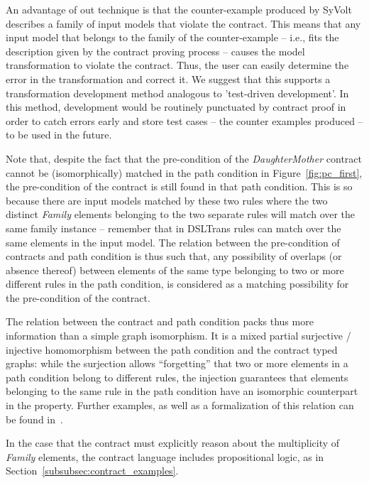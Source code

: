 An advantage of out technique is that the counter-example produced by SyVolt
describes a family of
input models that violate the contract.
This means that any input model that belongs to the family of the
counter-example -- i.e., fits the description given by the contract proving
process -- causes the model transformation to violate the contract.  Thus, the user can
easily determine the error in the transformation and correct it. We suggest that
this supports a transformation development method analogous to 'test-driven
development'. In this method, development would be routinely punctuated by
contract proof in order to catch errors early and store test cases -- the
counter examples produced -- to be used in the future.



Note that, despite the fact that the pre-condition of the
\textit{Daughter\-Mother} contract cannot be (isomorphically) matched in the path
condition in Figure~\ref{fig:pc_first}, the pre-condition of the contract is still
found in that path condition. This is so because there are input models
matched by these two rules where the two distinct \textit{Family} elements
belonging to the two separate rules will match over the same family instance --
remember that in DSLTrans rules can match over the same elements in the input
model. The relation between the pre-condition of contracts and path condition is
thus such that, any possibility of overlaps (or absence thereof) between
elements of the same type belonging to two or more different rules in the path condition,
is considered as a matching possibility for the pre-condition of the
contract.

The relation between the contract and path condition packs thus more
information than a simple graph isomorphism. It is a mixed partial surjective /
injective homomorphism between the path condition and the contract typed graphs:
while the surjection allows ``forgetting'' that two or more elements in a path condition belong to
different rules, the injection guarantees that elements belonging to the
same rule in the path condition have an isomorphic counterpart in the property.
Further examples, as well as a formalization of this relation can be found in~\cite{Lucio2014}.

 In the case that the contract must explicitly reason about the multiplicity of \textit{Family} elements, the contract language includes
 propositional logic, as in Section~\ref{subsubsec:contract_examples}.





 